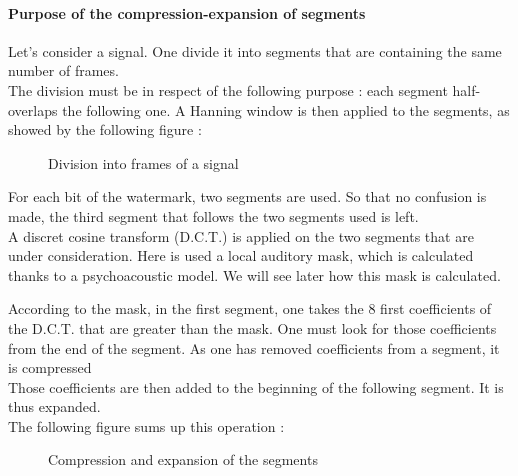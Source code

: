 \paragraph{Purpose of the compression-expansion of segments}
Let's consider a signal. One divide it into segments that are containing the same number of frames.\\
The division must be in respect of the following purpose : each segment half-overlaps the following one. A Hanning window is then applied to the segments, as showed by the following figure :
\begin{figure}[H]
\caption{\label{frames} Division into frames of a signal}
\end{figure}
For each bit of the watermark, two segments are used. So that no confusion is made, the third segment that follows the two segments used is left.\\
A discret cosine transform (D.C.T.) is applied on the two segments that are under consideration. Here is used a local auditory mask, which is calculated thanks to a psychoacoustic model. We will see later how this mask is calculated.

According to the mask, in the first segment, one takes the 8 first coefficients of the D.C.T. that are greater than the mask. One must look for those coefficients from the end of the segment. As one has removed coefficients from a segment, it is compressed\\
Those coefficients are then added to the beginning of the following segment. It is thus expanded.\\
The following figure sums up this operation :
\begin{figure}[H]
\caption{\label{compression-expansion} Compression and expansion of the segments}
\end{figure}

